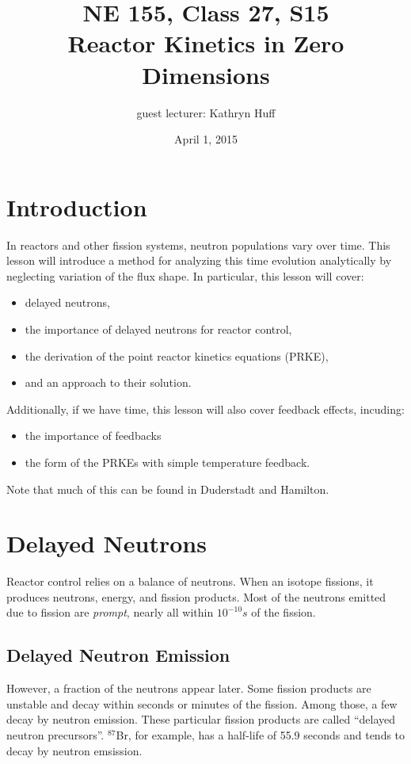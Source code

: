 \documentclass[12pt]{article}
\title{NE 155, Class 27, S15 \\
Reactor Kinetics in Zero Dimensions}
\date{April 1, 2015}
\begin{document}
\author{guest lecturer: Kathryn Huff}
\maketitle

\hrulefill

\section{Introduction}

In reactors and other fission systems, neutron populations vary over time. This 
lesson will introduce a method for analyzing this time evolution analytically 
by neglecting variation of the flux shape. In particular, this lesson will 
cover:

\begin{itemize}
\item delayed neutrons,
\item the importance of delayed neutrons for reactor control,
\item the derivation of the point reactor kinetics equations (PRKE),
\item and an approach to their solution.
\end{itemize}

Additionally, if we have time, this lesson will also cover feedback effects, 
incuding: 
\begin{itemize}
\item the importance of feedbacks
\item the form of the PRKEs with simple temperature feedback.
\end{itemize}

Note that much of this can be found in Duderstadt and Hamilton.


\section{Delayed Neutrons}
Reactor control relies on a balance of neutrons. When an isotope fissions, it 
produces neutrons, energy, and fission products.  Most of the neutrons emitted 
due to fission are \emph{prompt}, nearly all within $10^{-10}s$ of the fission. 

\subsection{Delayed Neutron Emission}
However, a fraction of the neutrons appear later. Some fission products are 
unstable and decay within seconds or minutes of the fission. Among those, a few 
decay by neutron emission. These particular fission products are called ``delayed 
neutron precursors''.  $^{87}$Br, for example, has a half-life of 55.9 seconds 
and tends to decay by neutron emsission.
\end{document}
